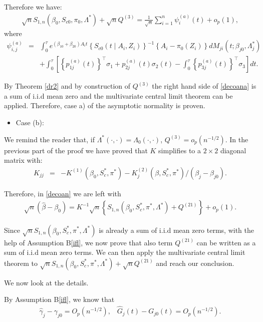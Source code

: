 \documentclass[11pt]{article}
\newcommand{\ee}{\end{eqnarray}}
\newcommand{\eqnn}{\begin{eqnarray*}}
\newcommand{\een}{\end{eqnarray*}}
\newcommand{\be}{\begin{eqnarray}}
\begin{document}
Therefore we have:
\be\label{anpswna}
\sqrt{n}{S}_{1,n}(\beta_0, S_{c0},  \pi_0,  \Lambda^{*})+\sqrt{n}{Q}^{(3)}=\frac{1}{\sqrt{n}}\sum_{i=1}^n \psi^{(a)}_{i}(t)+o_p(1),
\ee
where 
\eqnn
\psi^{(a)}_{i,j}&=&\int_0^\tau e^{ (\beta_{10}  + \beta_{20}) A_i t} \left\{S_{c0}(t \mid A_i,Z_i)\right\}^{-1}\left\{A_i -\pi_{0}( Z_i)\right\}dM_{ji}(t; \beta_{j0},\Lambda^{*}_j)\\&&+\int_0^\tau \left[\left\{p^{(a)}_{1j}(t)\right\}^\top \sigma_{1}+ p^{(a)}_{2j}(t)  \sigma_{2}(t)-\int_0^\tau \left\{p^{(a)}_{3j}(t)\right\}^\top  \sigma_{3} \right]dt.
\een

By Theorem \ref{dr2} and by construction of ${Q}^{(3)}$ the right hand side of \eqref{decoana} is a sum of i.i.d mean zero and the multivariate central limit theorem can be applied.
Therefore, case a) of the asymptotic normality is proven. 

\begin{itemize}
\item{Case (b):}
\end{itemize}
We remind the reader that, if $\Lambda^{*}(\cdot,\cdot)=\Lambda_{0}(\cdot,\cdot)$, ${Q}^{(3)}=o_p(n^{-1/2})$.
In the previous part of the proof we have proved that ${K}$ simplifies to a $2\times2$ diagonal matrix with:
\eqnn
{K}_{jj}&=&-K^{(1)}(\beta_0,S^{*}_c,  \pi^{*})-K^{(2)}_j(\beta,S^{*}_c,  \pi^{*})/(\beta_j-\beta_{j0}).
\een

Therefore, in \eqref{decoan} we are left with 
\be\label{decoanb}
\sqrt{n}(\hat{{\beta}}-{\beta}_{0})={K}^{-1}\sqrt{n}\left\{{S}_{1,n}(\beta_0, S^{*}_c,  \pi^{*}, \Lambda^{*})+{Q}^{(21)}\right\}+o_p(1).
\ee

Since $\sqrt{n}{S}_{1,n}(\beta_0, S^{*}_c,  \pi^{*}, \Lambda^{*})$ is already a sum of i.i.d mean zero terms, with the help of Assumption B\ref{ifl}, we now prove that also term ${Q}^{(21)}$ can be written as a sum of i.i.d mean zero terms.
We can then apply the multivariate central limit theorem to $\sqrt{n}{S}_{1,n}(\beta_0, S^{*}_c,  \pi^{*}, \Lambda^{*})+\sqrt{n}{Q}^{(21)}$ and reach our conclusion.

We now look at the details.

By Assumption B\ref{ifl}, we know that 
\eqnn
\hat \gamma_{j}-\gamma_{j0}=O_p(n^{-1/2}),\;\;\;\hat G_j(t)-G_{j0}(t)=O_p(n^{-1/2}).
\een
\end{document}
